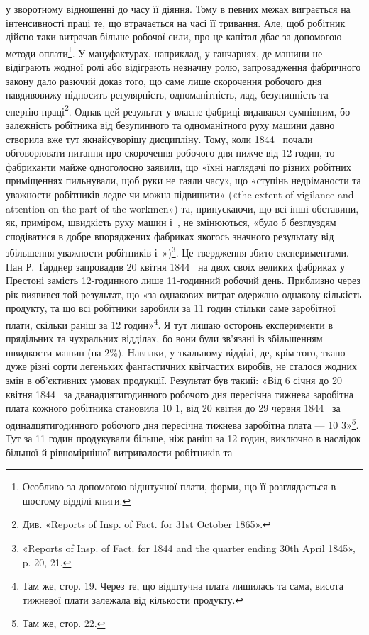 \parcont{}  %
у зворотному відношенні до часу її діяння. Тому в певних межах
виграється на інтенсивності праці те, що втрачається на часі її
тривання. Але, щоб робітник дійсно таки витрачав більше робочої
сили, про це капітал дбає за допомогою методи оплати\footnote{
Особливо за допомогою відштучної плати, форми, що її розглядається
в шостому відділі книги.
}. У мануфактурах,
наприклад, у ганчарнях, де машини не відіграють
жодної ролі або відіграють незначну ролю, запровадження фабричного
закону дало разючий доказ того, що саме лише скорочення
робочого дня навдивовижу підносить реґулярність, одноманітність,
лад, безупинність та енерґію праці\footnote{
Див. «Reports of Insp. of Fact. for 31st October 1865».
}. Однак цей результат
у власне фабриці видавався сумнівним, бо залежність робітника
від безупинного та одноманітного руху машини давно створила
вже тут якнайсуворішу дисципліну. Тому, коли 1844~
почали обговорювати питання про скорочення робочого дня
нижче від 12 годин, то фабриканти майже одноголосно заявили,
що «їхні наглядачі по різних робітних приміщеннях пильнували,
щоб руки не гаяли часу», що «ступінь недріманости та уважности
робітників ледве чи можна підвищити» («the extent of vigilance
and attention on the part of the workmen») та, припускаючи, що всі
інші обставини, як, приміром, швидкість руху машин і~,
не змінюються, «було б безглуздям сподіватися в добре впоряджених
фабриках якогось значного результату від збільшення
уважности робітників і~»)\footnote{
«Reports of Insp. of Fact. for 1844 and the quarter ending 30th
April 1845», p. 20, 21.
}. Це твердження збито експериментами.
Пан Р.~Ґарднер запровадив 20 квітня 1844~ на двох
своїх великих фабриках у Престоні замість 12-годинного лише
11-годинний робочий день. Приблизно через рік виявився
той результат, що «за однакових витрат одержано однакову
кількість продукту, та що всі робітники заробили за 11 годин
стільки саме заробітної плати, скільки раніш за 12 годин»\footnote{
Там же, стор. 19. Через те, що відштучна плата лишилась та
сама, висота тижневої плати залежала від кількости продукту.
}.
Я тут лишаю осторонь експерименти в прядільних та чухральних
відділах, бо вони були зв’язані із збільшенням швидкости машин
(на 2\%). Навпаки, у ткальному відділі, де, крім того, ткано
дуже різні сорти легеньких фантастичних квітчастих виробів,
не сталося жодних змін в об’єктивних умовах продукції. Результат
був такий: «Від 6 січня до 20 квітня 1844~ за дванадцятигодинного
робочого дня пересічна тижнева заробітна плата кожного
робітника становила 10 1, від 20 квітня до
29 червня 1844~ за одинадцятигодинного робочого дня пересічна
тижнева заробітна плата — 10 3»\footnote{
Там же, стор. 22.
}. Тут за
11 годин продукували більше, ніж раніш за 12 годин, виключно
в наслідок більшої й рівномірнішої витривалости робітників та
\parbreak{}  %

